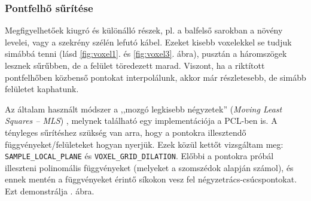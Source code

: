 \documentclass[a4paper,oneside]{article}
\begin{document}
\subsubsection{Pontfelhő sűrítése}

Megfigyelhetőek kiugró és különálló részek, pl. a balfelső sarokban a növény levelei, vagy a szekrény szélén lefutó kábel. Ezeket kisebb voxelekkel se tudjuk simábbá tenni (lásd \ref{fig:voxel1}. és \ref{fig:voxel3}. ábra), pusztán a háromszögek lesznek sűrűbben, de a felület töredezett marad. Viszont, ha a riktított pontfelhőben közbenső pontokat interpolálunk, akkor már részletesebb, de simább felületet kaphatunk.

Az általam használt módszer a ,,mozgó legkisebb négyzetek'' (\textit{Moving Least Squares -- MLS}) \cite{mls}, melynek található egy implementációja a PCL-ben is. A tényleges sűrítéshez szükség van arra, hogy a pontokra illesztendő függvényeket/felületeket hogyan nyerjük. Ezek közül kettőt vizsgáltam meg: \texttt{SAMPLE\_LOCAL\_PLANE} és \texttt{VOXEL\_GRID\_DILATION}. Előbbi a pontokra próbál illeszteni polinomális függvényeket (melyeket a szomszédok alapján számol), és ennek mentén a függvényeket érintő síkokon vesz fel négyzetrács-csúcspontokat. Ezt demonstrálja . ábra.
\end{document}

